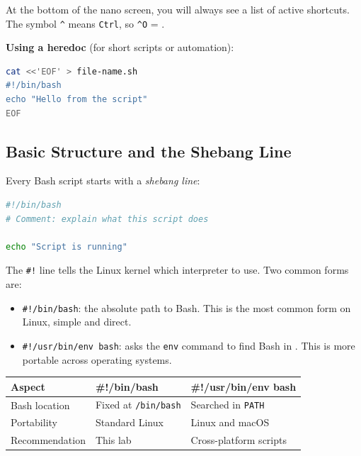 \begin{notebox}
At the bottom of the nano screen, you will always see a list of active
shortcuts. The symbol \texttt{\^{}} means \texttt{Ctrl}, so
\texttt{\^{}O} = .
\end{notebox}

\textbf{Using a heredoc} (for short scripts or automation):
\begin{lstlisting}[language=bash, caption={Creating a file with a heredoc}]
cat <<'EOF' > file-name.sh
#!/bin/bash
echo "Hello from the script"
EOF
\end{lstlisting}

\subsection*{Basic Structure and the Shebang Line}

Every Bash script starts with a \textit{shebang line}:

\begin{lstlisting}[language=bash, caption={Basic structure of a Bash script}]
#!/bin/bash
# Comment: explain what this script does

echo "Script is running"
\end{lstlisting}

The \texttt{\#!} line tells the Linux kernel which interpreter to use. Two
common forms are:

\begin{itemize}
  \item \texttt{\#!/bin/bash}: the absolute path to Bash. This is the most
    common form on Linux, simple and direct.
  \item \texttt{\#!/usr/bin/env bash}: asks the \texttt{env} command to find
    Bash in . This is more portable across operating systems.
\end{itemize}

\begin{center}
\begin{tabular}{lll}
\hline
\textbf{Aspect} & \textbf{\#!/bin/bash} & \textbf{\#!/usr/bin/env bash} \\
\hline
Bash location & Fixed at \texttt{/bin/bash} & Searched in \texttt{PATH} \\
Portability & Standard Linux & Linux and macOS \\
Recommendation & This lab & Cross-platform scripts \\
\hline
\end{tabular}
\end{center}

